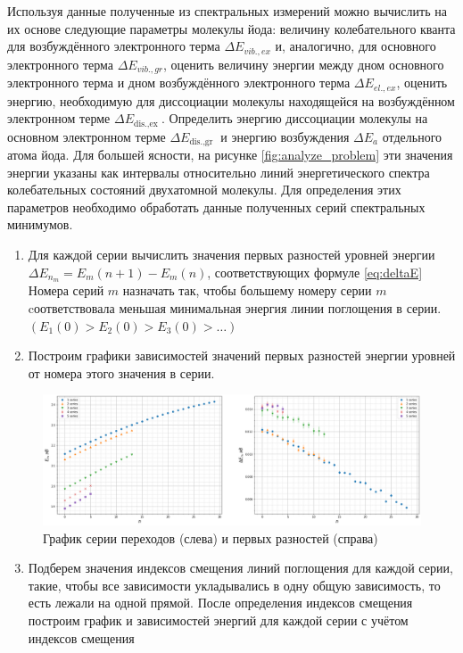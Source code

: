 \documentclass[11.5pt,a4paper,russian]{article}
\begin{document}
Используя данные полученные из спектральных измерений можно вычислить на их основе следующие параметры молекулы йода: величину колебательного кванта для возбуждённого электронного терма $\Delta E_{v i b ., e x}$ и, аналогично, для основного электронного терма $\Delta E_{v i b ., g r}$, оценить величину энергии между дном основного электронного терма и дном возбуждённого электронного терма $\Delta E_{e l ., e x}$, оценить энергию, необходимую для диссоциации молекулы находящейся на возбуждённом электронном терме $\Delta E_{\text {dis.,ex }}$. Определить энергию диссоциации молекулы на основном электронном терме $\Delta E_{\text {dis.,gr }}$ и энергию возбуждения $\Delta E_a$ отдельного атома йода. Для большей ясности, на рисунке \ref{fig:analyze_problem} эти значения энергии указаны как интервалы относительно линий энергетического спектра колебательных состояний двухатомной молекулы. Для определения этих параметров необходимо обработать данные полученных серий спектральных минимумов.

\begin{enumerate}
  \item Для каждой серии вычислить значения первых разностей уровней энергии $\Delta E_{n_m}=E_m(n+1)-E_m(n)$, соответствующих формуле \eqref{eq:deltaE} Номера серий $m$ назначать так, чтобы большему номеру серии $m$ cоответствовала меньшая минимальная энергия линии поглощения в серии. $\left(E_1(0)>E_2(0)>E_3(0)>\ldots\right)$
  \item Построим графики зависимостей значений первых разностей энергии уровней от номера этого значения в серии.
\end{enumerate}

\begin{figure}[h!]
  \centering
  \includegraphics[width=\textwidth]{4246b306-1dae-4c38-90dc-b70b657b2cbb}  \caption{График серии переходов (слева) и первых разностей (справа)}
\end{figure}

\begin{enumerate}
  \setcounter{enumi}{2}
  \item Подберем значения индексов смещения линий поглощения для каждой серии, такие, чтобы все зависимости укладывались в одну общую зависимость, то есть лежали на одной прямой. После определения индексов смещения построим график и зависимостей энергий для каждой серии с учётом индексов смещения
\end{enumerate}
\end{document}
